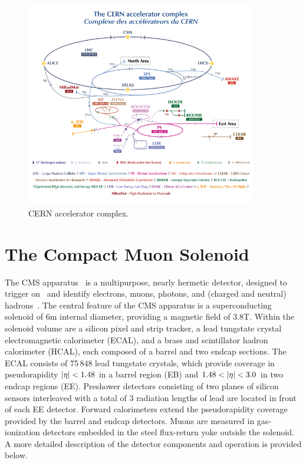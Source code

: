 \begin{figure}
  \centering
   \includegraphics[width=0.9\textwidth]{fig/experiment/CCC-v2019-final-white.png}
	\caption{CERN accelerator complex.}
	\label{fig:accelerator_complex}
\end{figure}


\section{The Compact Muon Solenoid}
The CMS apparatus~\cite{CMS:2008xjf} is a multipurpose, nearly hermetic detector, designed to trigger on~\cite{CMS:2020cmk,CMS:2016ngn} and identify electrons, muons, photons, and (charged and neutral) hadrons~\cite{CMS:2015xaf,CMS:2018rym,CMS:2015myp,CMS:2014pgm}.
The central feature of the CMS apparatus is a superconducting solenoid of 6\unit{m} internal diameter, providing a magnetic field of $3.8$\unit{T}. Within the solenoid volume are a silicon pixel and strip tracker, a lead tungstate crystal electromagnetic calorimeter (ECAL), and a brass and scintillator hadron calorimeter (HCAL), each composed of a barrel and two endcap sections. The ECAL consists of 75\,848 lead tungstate crystals, which provide coverage in pseudorapidity $\lvert \eta \rvert < 1.48 $ in a barrel region (EB) and $1.48 < \lvert \eta \rvert < 3.0$ in two endcap regions (EE). Preshower detectors consisting of two planes of silicon sensors interleaved with a total of $3$ radiation lengths of lead are located in front of each EE detector. Forward calorimeters extend the pseudorapidity coverage provided by the barrel and endcap detectors. Muons are measured in gas-ionization detectors embedded in the steel flux-return yoke outside the solenoid. A more detailed description of the detector components and operation is provided below. 


